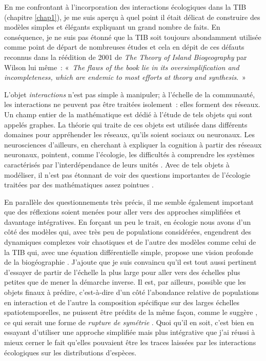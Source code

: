 En me confrontant à l'incorporation des interactions écologiques dans la
TIB (chapitre \ref{chap1}), je me suis aperçu à quel point il était
délicat de construire des modèles simples et élégants expliquant un
grand nombre de faits. En conséquence, je ne suis pas étonné que la TIB
soit toujours abondamment utilisée comme point de départ de nombreuses
études \citep{Warren2015} et cela en dépit de ces défauts reconnus dans
la réédition de 2001 de \emph{The Theory of Island Biogeography} par
Wilson lui même~: «~\emph{The flaws of the book lie in its
oversimplification and incompleteness, which are endemic to most efforts
at theory and synthesis}.~»

L'objet \emph{interactions} n'est pas simple à manipuler; à l'échelle de
la communauté, les interactions ne peuvent pas être traitées isolement~:
elles forment des réseaux. Un champ entier de la mathématique est dédié
à l'étude de tels objets qui sont appelés graphes. La théorie qui traite
de ces objets est utilisée dans différents domaines pour appréhender les
réseaux, qu'ils soient sociaux ou neuronaux. Les neurosciences
d'ailleurs, en cherchant à expliquer la cognition à partir des réseaux
neuronaux, pointent, comme l'écologie, les difficultés à comprendre les
systèmes caractérisés par l'interdépendance de leurs unités
\citep{Park2013}. Avec de tels objets à modéliser, il n'est pas étonnant
de voir des questions importantes de l'écologie traitées par des
mathématiques assez pointues \citep{Allesina2012a, Rohr2014}.

En parallèle des questionnements très précis, il me semble également
important que des réflexions soient menées pour aller vers des approches
simplifiées et davantage intégratives. En forçant un peu le trait, en
écologie nous avons d'un côté des modèles qui, avec très peu de
populations considérées, engendrent des dynamiques complexes voir
chaotiques \citep[dont l'existence est validée
expérimentalement][]{Costantino1997b, Fussmann2000} et de l'autre des
modèles comme celui de la TIB qui, avec une équation différentielle
simple, propose une vision profonde de la biogéographie
\citep{MacArthur1967}. J'ajoute que je suis convaincu qu'il est tout
aussi pertinent d'essayer de partir de l'échelle la plus large pour
aller vers des échelles plus petites que de mener la démarche inverse.
Il est, par ailleurs, possible que les objets finaux à prédire,
c'est-à-dire d'un côté l'abondance relative de populations en
interaction et de l'autre la composition spécifique sur des larges
échelles spatiotemporelles, ne puissent être prédits de la même façon,
comme le suggère \citet{Lawton1999}, ce qui serait une forme de
\emph{rupture de symétrie} \citep[au sens de][]{Anderson1972}. Quoi
qu'il en soit, c'est bien en essayant d'utiliser une approche simplifiée
mais plus intégrative que j'ai réussi à mieux cerner le fait qu'elles
pouvaient être les traces laissées par les interactions écologiques sur
les distributions d'espèces.

